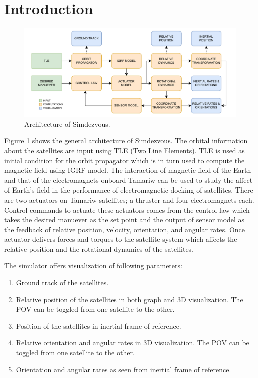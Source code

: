 \documentclass{article}
\begin{document}
\section{Introduction}

\begin{figure}[ht]
  \centering
  \includegraphics[scale=0.7]{assets/architecture.pdf}
  \caption{Architecture of Simdezvous.}
  \label{fig:architecture}
\end{figure}

Figure \ref{fig:architecture} shows the general architecture of Simdezvous. The orbital information about the satellites are input using TLE (Two Line Elements). TLE is used as initial condition for the orbit propagator which is in turn used to compute the magnetic field using IGRF model. The interaction of magnetic field of the Earth and that of the electromagnets onboard Tamariw can be used to study the affect of Earth's field in the performance of electromagnetic docking of satellites. There are two actuators on Tamariw satellites; a thruster and four electromagnets each. Control commands to actuate these actuators comes from the control law which takes the desired manuever as the set point and the output of sensor model as the feedback of relative position, velocity, orientation, and angular rates. Once actuator delivers forces and torques to the satellite system which affects the relative position and the rotational dynamics of the satellites.

The simulator offers visualization of following parameters:

\begin{enumerate}[noitemsep]
  \item Ground track of the satellites.
  \item Relative position of the satellites in both graph and 3D visualization. The POV can be toggled from one satellite to the other.
  \item Position of the satellites in inertial frame of reference.
  \item Relative orientation and angular rates in 3D visualization. The POV can be toggled from one satellite to the other.
  \item Orientation and angular rates as seen from inertial frame of reference.
\end{enumerate}
\end{document}
